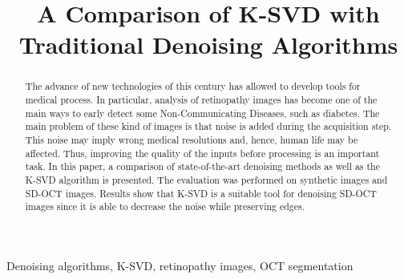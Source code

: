 \documentclass[conference]{IEEEtran}
\begin{document}
\title{A Comparison of K-SVD with Traditional Denoising Algorithms}

\author{
}
\maketitle
\thispagestyle{plain}
\pagestyle{plain}

\begin{abstract}
The advance of new technologies of this century has allowed to develop tools for medical process. In particular, analysis of retinopathy images has become one of the main ways to early detect some Non-Communicating Diseases, such as diabetes. The main problem of these kind of images is that noise is added during the acquisition step. This noise may imply wrong medical resolutions and, hence, human life may be affected. Thus, improving the quality of the inputs before processing is an important task. In this paper, a comparison of state-of-the-art denoising methods as well as the K-SVD algorithm is presented. The evaluation was performed on synthetic images and SD-OCT images. Results show that K-SVD is a suitable tool for denoising SD-OCT images since it is able to decrease the noise while preserving edges.
\end{abstract}

\begin{IEEEkeywords}
Denoising algorithms, K-SVD, retinopathy images, OCT segmentation
\end{IEEEkeywords}
\IEEEpeerreviewmaketitle












\end{document}
